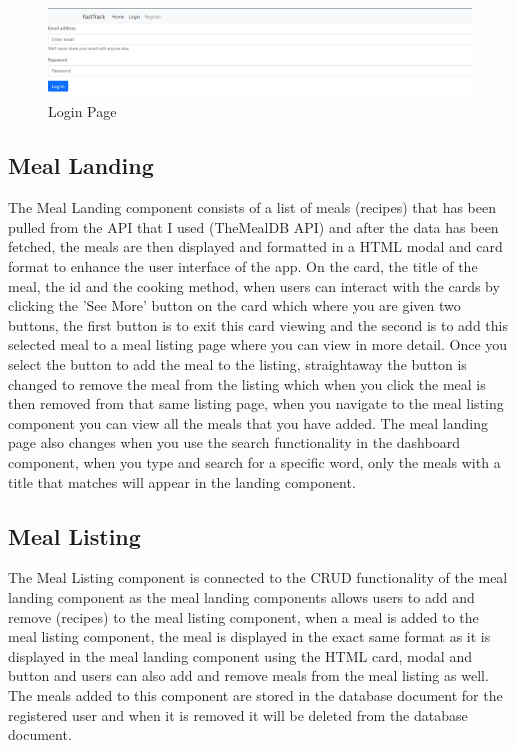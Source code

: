 \begin{center}
  \begin{figure}[H]
    \includegraphics[width=\textwidth]{img/login.png}
    \caption{Login Page}
    \label{fig: Image of Login Page}
  \end{figure}
\end{center}

\subsection{Meal Landing}

The Meal Landing component consists of a list of meals (recipes) that has been pulled from the API that I used (TheMealDB API) and after the data has been fetched, the meals are then displayed and formatted in a HTML modal and card format to enhance the user interface of the app. On the card, the title of the meal, the id and the cooking method, when users can interact with the cards by clicking the 'See More' button on the card which where you are given two buttons, the first button is to exit this card viewing and the second is to add this selected meal to a meal listing page where you can view in more detail. Once you select the button to add the meal to the listing, straightaway the button is changed to remove the meal from the listing which when you click the meal is then removed from that same listing page, when you navigate to the meal listing component you can view all the meals that you have added. The meal landing page also changes when you use the search functionality in the dashboard component, when you type and search for a specific word, only the meals with a title that matches will appear in the landing component.

\subsection{Meal Listing}

The Meal Listing component is connected to the CRUD functionality of the meal landing component as the meal landing components allows users to add and remove (recipes) to the meal listing component, when a meal is added to the meal listing component, the meal is displayed in the exact same format as it is displayed in the meal landing component using the HTML card, modal and button and users can also add and remove meals from the meal listing as well. The meals added to this component are stored in the database document for the registered user and when it is removed it will be deleted from the database document.

